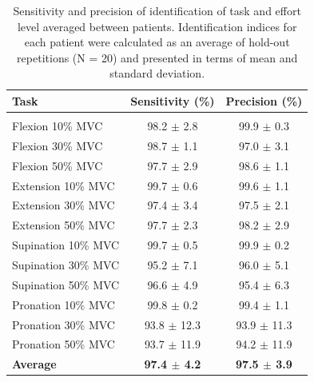 \begin{table}[h!]
\centering
\caption{Sensitivity and precision of identification of task and effort level averaged between patients. Identification indices for each patient were calculated as an average of hold-out repetitions (N = 20) and presented in terms of mean and standard deviation.}
\small
\vspace{3mm}
\label{tb:3-2}
\begin{threeparttable}
\begin{tabular}{lcc}
Task       & Sensitivity (\%)           & Precision (\%) \\ \hline
              &                &                                              \\
Flexion 10\% MVC             & 98.2 $\pm$ 2.8             & 99.9 $\pm$ 0.3                      \\
Flexion 30\% MVC             & 98.7 $\pm$ 1.1            & 97.0 $\pm$ 3.1                      \\
Flexion 50\% MVC             & 97.7 $\pm$ 2.9             & 98.6 $\pm$ 1.1                         \\
Extension 10\% MVC             & 99.7 $\pm$ 0.6            & 99.6 $\pm$ 1.1             \\
Extension 30\% MVC             & 97.4 $\pm$ 3.4             & 97.5 $\pm$ 2.1                      \\
Extension 50\% MVC             & 97.7 $\pm$ 2.3             & 98.2 $\pm$ 2.9                      \\
Supination 10\% MVC             & 99.7 $\pm$ 0.5             & 99.9 $\pm$ 0.2                          \\
Supination 30\% MVC             & 95.2 $\pm$ 7.1            & 96.0 $\pm$ 5.1             \\
Supination 50\% MVC             & 96.6 $\pm$ 4.9             & 95.4 $\pm$ 6.3                      \\
Pronation 10\% MVC             & 99.8 $\pm$ 0.2             & 99.4 $\pm$ 1.1                      \\
Pronation 30\% MVC             & 93.8 $\pm$ 12.3             & 93.9 $\pm$ 11.3                          \\
Pronation 50\% MVC             & 93.7 $\pm$ 11.9            & 94.2 $\pm$ 11.9             \\
\textbf{Average}             & \textbf{97.4 $\pm$ 4.2}             & \textbf{97.5 $\pm$ 3.9}           
\end{tabular}
    \end{threeparttable}
\end{table}



